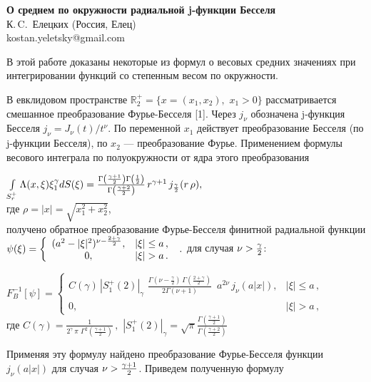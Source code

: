 
\begin{center}
	{\bf О среднем по окружности радиальной j-функции Бесселя }\\
	К.\,C.~Елецких (Россия, Елец)\\
	kostan.yeletsky@gmail.com\\
\end{center}


В этой работе доказаны некоторые из формул о весовых средних значениях при интегрировании  функций со степенным весом по окружности.

В евклидовом пространстве $\mathbb{R}_2^+=\{x=(x_1,x_2),\,\,x_1>0\}$ рассматривается смешанное преобразование Фурье-Бесселя [1]. Через $j_\nu$ обозначена j-функция Бесселя
$j_\nu=J_\nu(t)/t^\nu$. По  переменной $x_1$ действует преобразование Бесселя (по j-функции Бесселя), по $x_2$ --- преобразование Фурье. Применением  формулы  весового интеграла по полуокружности от ядра этого преобразования

$\int\limits_{S_r^+}{\Lambda(x,\xi)\xi_1^\gamma}dS(\xi)
=\frac{\Gamma\left(\gamma+1\over2\right)\Gamma\left(1\over2\right)}{\Gamma\left(\gamma+2\over2\right)}\,r^{\gamma+1}\,j_{\frac{\gamma}{2}}(r\,\rho),$\\
где $\rho=|x|=\sqrt{x_1^2+x_2^2}$,
\\  получено обратное преобразование Фурье-Бесселя финитной радиальной функции $\psi(\xi)=\left\{ \begin{array}{cc}
          (a^2-|\xi|^2)^{{\nu-{2+\gamma\over2}}} , & |\xi|\le a\,, \\
					   0  ,& |\xi|>a\,.
\end{array}\right.\,\,.$ для случая $\nu>{\gamma\over2}$:

$F^{-1}_B[\psi]=\left\{ \begin{array}{cc}
          C(\gamma)\,|S^+_1(2)|_\gamma \,\,\frac{\Gamma\left(\nu-\frac{\gamma}{2}\right)\,\Gamma\left(\frac{2+\gamma}{2}\right)}
{2\Gamma\left(\nu+1\right)}\,\,\,a^{2\nu}\,
j_{\nu}(a|x|) , & |\xi|\le a\,, \\
					   0  ,& |\xi|>a\,,
\end{array}\right.\,\,$\\
где $C(\gamma)=\frac{1}{2^{\gamma}\,\pi\,\,\Gamma^2\left(\frac{\gamma+1}{2}\right)}\,,$ $|S^+_1(2)|_\gamma=\sqrt{\pi}\frac{\Gamma(\frac{\gamma+1}{2})}{\Gamma(\frac{\gamma+2}{2})}$

Применяя эту формулу найдено преобразование Фурье-Бесселя функции $j_\nu(a|x|)$ для случая $\nu>{\gamma+1\over2}$. Приведем полученную формулу

